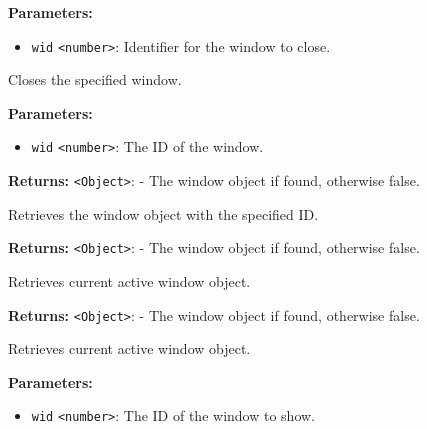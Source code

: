 \documentclass[12pt,a4paper]{article}
\begin{document}
\noindent \textbf{Parameters:}
\begin{itemize}
  \item \texttt{wid} \texttt{<number>}: Identifier for the window to close.
\end{itemize}

\noindent Closes the specified window.

\vspace{5mm}
\noindent {}


\noindent \textbf{Parameters:}
\begin{itemize}
  \item \texttt{wid} \texttt{<number>}: The ID of the window.
\end{itemize}

\noindent \textbf{Returns:} \texttt{<Object>}: - The window object if found, otherwise false.

\noindent Retrieves the window object with the specified ID.

\vspace{5mm}
\noindent {}


\noindent \textbf{Returns:} \texttt{<Object>}: - The window object if found, otherwise false.

\noindent Retrieves current active window object.

\vspace{5mm}
\noindent {}


\noindent \textbf{Returns:} \texttt{<Object>}: - The window object if found, otherwise false.

\noindent Retrieves current active window object.

\vspace{5mm}
\noindent {}


\noindent \textbf{Parameters:}
\begin{itemize}
  \item \texttt{wid} \texttt{<number>}: The ID of the window to show.
\end{itemize}
\end{document}
